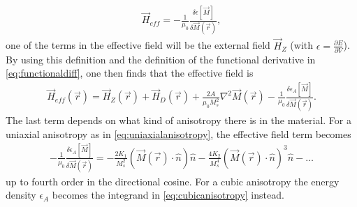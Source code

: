 \documentclass[12pt, a4paper, twoside, openright]{article}		%
\numberwithin{equation}{section}
\begin{document}
\begin{align}
\vec{H}_{eff} = -\frac{1}{\mu_0}\frac{\delta \epsilon[\vec{M}]}{\delta \vec{M}(\vec{r})},
\end{align}
one of the terms in the effective field will be the external field $\vec{H}_Z$ (with $\epsilon = \frac{\partial E}{\partial V}$). By using this definition and the definition of the functional derivative in \eqref{eq:functionaldiff}, one then finds that the effective field is
\begin{align}
\label{eq:effectivefield}
\vec{H}_{eff}(\vec{r}) = \vec{H}_Z(\vec{r}) + \vec{H}_D(\vec{r}) + \frac{2A}{\mu_0M_s^2}\nabla^2\vec{M}(\vec{r}) -\frac{1}{\mu_0}\frac{\delta \epsilon_A[\vec{M}]}{\delta \vec{M}(\vec{r})}.
\end{align}
The last term depends on what kind of anisotropy there is in the material. For a uniaxial anisotropy as in \eqref{eq:uniaxialanisotropy}, the effective field term becomes 
\begin{align}
\label{eq:effielduniaxialani}
-\frac{1}{\mu_0}\frac{\delta \epsilon_A[\vec{M}]}{\delta \vec{M}(\vec{r})} = -\frac{2K_1}{M_s^2}(\vec{M}(\vec{r})\cdot\hat{n})\hat{n} - \frac{4K_2}{M_s^4}(\vec{M}(\vec{r})\cdot\hat{n})^3\hat{n} - \ldots
\end{align}
up to fourth order in the directional cosine. For a cubic anisotropy the energy density $\epsilon_A$ becomes the integrand in \eqref{eq:cubicanisotropy} instead.
\end{document}
